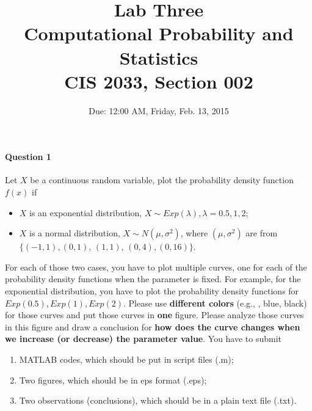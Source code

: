 \documentclass[11pt]{article} %
\title{Lab Three\\
Computational Probability and Statistics \\
CIS 2033, Section 002}
\author{Due: 12:00 AM, Friday, Feb. 13, 2015}
\date{} %
\begin{document}
\maketitle

\paragraph*{Question 1}
Let $X$ be a continuous random variable, plot the probability density function $f(x)$ if
\begin{itemize}
\item $X$ is an exponential distribution, $X \sim Exp(\lambda), \lambda = 0.5, 1, 2$;
\item $X$ is a normal distribution, $X \sim N(\mu, \sigma^2)$, where $(\mu, \sigma^2)$ are from $\{(-1, 1), (0, 1)$, $(1, 1)$, $(0, 4), (0, 16)\}$.
\end{itemize}
For each of those two cases, you have to plot multiple curves, one for each of the probability density functions when the parameter is fixed. For example, for the exponential distribution, you have to plot the probability density functions for $Exp(0.5), Exp(1), Exp(2)$. Please use {\bf different colors} (e.g., {\color{red}{red}}, {\color{blue}blue}, {\color{black}black}) for those curves and put those curves in {\bf one} figure. Please analyze those curves in this figure and draw a conclusion for {\bf how does the curve changes when we increase (or decrease) the parameter value}. 
You have to submit 
\begin{enumerate}
\item MATLAB codes, which should be put in script files (.m); 
\item Two figures, which should be in eps format (.eps);
\item Two observations (conclusions), which should be in a plain text file (.txt). 
\end{enumerate}
\end{document}
